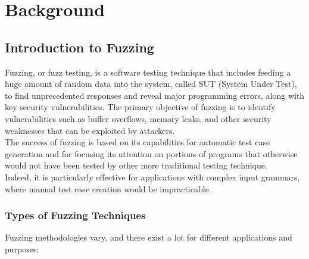 \chapter{Background}

\section{Introduction to Fuzzing}
Fuzzing, or fuzz testing, is a software testing technique that includes feeding a huge amount of random data into the system, called SUT (System Under Test), to find unprecedented responses and reveal major programming errors, along with key security vulnerabilities. The primary objective of fuzzing is to identify vulnerabilities such as buffer overflows, memory leaks, and other security weaknesses that can be exploited by attackers.
\\The success of fuzzing is based on its capabilities for automatic test case generation and for focusing its attention on portions of programs that otherwise would not have been tested by other more traditional testing technique.
\\Indeed, it is particularly effective for applications with complex input grammars, where manual test case creation would be impracticable.

\subsection{Types of Fuzzing Techniques}
Fuzzing methodologies vary, and there exist a lot for different applications and purposes:

